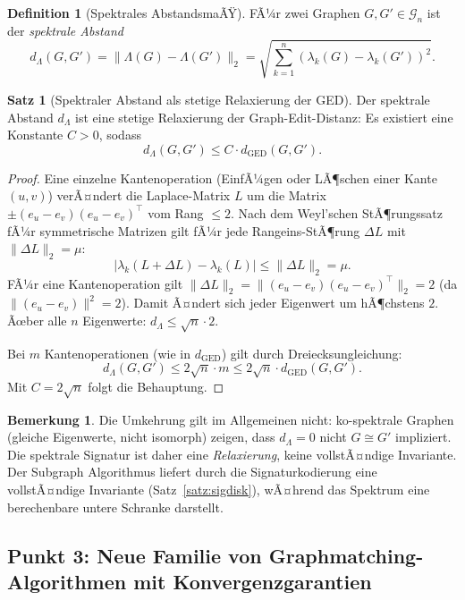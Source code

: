 ﻿\documentclass[a4paper,12pt]{article}
\theoremstyle{definition}
\newtheorem{definition}{Definition}
\newtheorem{satz}{Satz}
\newtheorem{bemerkung}{Bemerkung}
\begin{document}
\begin{definition}[Spektrales AbstandsmaÃŸ]
\label{def:specabst}
    FÃ¼r zwei Graphen $G, G' \in \mathcal{G}_n$ ist der \emph{spektrale Abstand}
    \[
    d_{\Lambda}(G, G') = \|\Lambda(G) - \Lambda(G')\|_2 = \sqrt{\sum_{k=1}^n (\lambda_k(G) - \lambda_k(G'))^2}.
    \]
\end{definition}

\begin{satz}[Spektraler Abstand als stetige Relaxierung der GED]
\label{satz:spekrelax}
    Der spektrale Abstand $d_\Lambda$ ist eine stetige Relaxierung der
    Graph-Edit-Distanz: Es existiert eine Konstante $C > 0$, sodass
    \[
    d_{\Lambda}(G, G') \leq C \cdot d_{\mathrm{GED}}(G, G').
    \]
\end{satz}

\begin{proof}
    Eine einzelne Kantenoperation (EinfÃ¼gen oder LÃ¶schen einer Kante $(u,v)$) verÃ¤ndert
    die Laplace-Matrix $L$ um die Matrix $\pm(e_u - e_v)(e_u - e_v)^\top$ vom Rang $\leq 2$.
    Nach dem Weyl'schen StÃ¶rungssatz fÃ¼r symmetrische Matrizen gilt fÃ¼r jede Rangeins-StÃ¶rung
    $\Delta L$ mit $\|\Delta L\|_2 = \mu$:
    \[
    |\lambda_k(L + \Delta L) - \lambda_k(L)| \leq \|\Delta L\|_2 = \mu.
    \]
    FÃ¼r eine Kantenoperation gilt $\|\Delta L\|_2 = \|(e_u - e_v)(e_u - e_v)^\top\|_2 = 2$
    (da $\|(e_u-e_v)\|^2 = 2$). Damit Ã¤ndert sich jeder Eigenwert um hÃ¶chstens $2$.
    Ãœber alle $n$ Eigenwerte: $d_\Lambda \leq \sqrt{n} \cdot 2$.

    Bei $m$ Kantenoperationen (wie in $d_{\mathrm{GED}}$) gilt durch Dreiecksungleichung:
    \[
    d_\Lambda(G, G') \leq 2\sqrt{n} \cdot m \leq 2\sqrt{n} \cdot d_{\mathrm{GED}}(G, G').
    \]
    Mit $C = 2\sqrt{n}$ folgt die Behauptung. \qedhere
\end{proof}

\begin{bemerkung}
    Die Umkehrung gilt im Allgemeinen nicht: ko-spektrale Graphen (gleiche Eigenwerte,
    nicht isomorph) zeigen, dass $d_\Lambda = 0$ nicht $G \cong G'$ impliziert.
    Die spektrale Signatur ist daher eine \emph{Relaxierung}, keine vollstÃ¤ndige Invariante.
    Der Subgraph Algorithmus liefert durch die Signaturkodierung eine vollstÃ¤ndige Invariante
    (Satz~\ref{satz:sigdisk}), wÃ¤hrend das Spektrum eine berechenbare untere Schranke darstellt.
\end{bemerkung}

\subsection{Punkt 3: Neue Familie von Graphmatching-Algorithmen mit Konvergenzgarantien}
\end{document}
